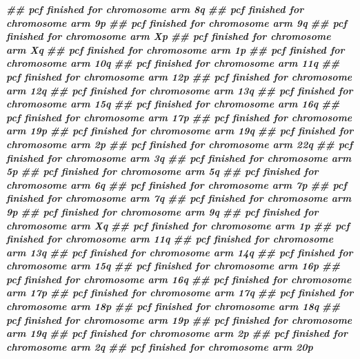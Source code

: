 \documentclass[
  12pt,
  a4paper,
  twoside]{book}
\newenvironment{Shaded}{\begin{snugshade}}{\end{snugshade}}
\newcommand{\DocumentationTok}[1]{\textcolor[rgb]{0.56,0.35,0.01}{\textbf{\textit{#1}}}}
\begin{document}
\begin{Shaded}
\begin{Highlighting}[]
\DocumentationTok{\#\# pcf finished for chromosome arm 8q }
\DocumentationTok{\#\# pcf finished for chromosome arm 9p }
\DocumentationTok{\#\# pcf finished for chromosome arm 9q }
\DocumentationTok{\#\# pcf finished for chromosome arm Xp }
\DocumentationTok{\#\# pcf finished for chromosome arm Xq }
\DocumentationTok{\#\# pcf finished for chromosome arm 1p }
\DocumentationTok{\#\# pcf finished for chromosome arm 10q }
\DocumentationTok{\#\# pcf finished for chromosome arm 11q }
\DocumentationTok{\#\# pcf finished for chromosome arm 12p }
\DocumentationTok{\#\# pcf finished for chromosome arm 12q }
\DocumentationTok{\#\# pcf finished for chromosome arm 13q }
\DocumentationTok{\#\# pcf finished for chromosome arm 15q }
\DocumentationTok{\#\# pcf finished for chromosome arm 16q }
\DocumentationTok{\#\# pcf finished for chromosome arm 17p }
\DocumentationTok{\#\# pcf finished for chromosome arm 19p }
\DocumentationTok{\#\# pcf finished for chromosome arm 19q }
\DocumentationTok{\#\# pcf finished for chromosome arm 2p }
\DocumentationTok{\#\# pcf finished for chromosome arm 22q }
\DocumentationTok{\#\# pcf finished for chromosome arm 3q }
\DocumentationTok{\#\# pcf finished for chromosome arm 5p }
\DocumentationTok{\#\# pcf finished for chromosome arm 5q }
\DocumentationTok{\#\# pcf finished for chromosome arm 6q }
\DocumentationTok{\#\# pcf finished for chromosome arm 7p }
\DocumentationTok{\#\# pcf finished for chromosome arm 7q }
\DocumentationTok{\#\# pcf finished for chromosome arm 9p }
\DocumentationTok{\#\# pcf finished for chromosome arm 9q }
\DocumentationTok{\#\# pcf finished for chromosome arm Xq }
\DocumentationTok{\#\# pcf finished for chromosome arm 1p }
\DocumentationTok{\#\# pcf finished for chromosome arm 11q }
\DocumentationTok{\#\# pcf finished for chromosome arm 13q }
\DocumentationTok{\#\# pcf finished for chromosome arm 14q }
\DocumentationTok{\#\# pcf finished for chromosome arm 15q }
\DocumentationTok{\#\# pcf finished for chromosome arm 16p }
\DocumentationTok{\#\# pcf finished for chromosome arm 16q }
\DocumentationTok{\#\# pcf finished for chromosome arm 17p }
\DocumentationTok{\#\# pcf finished for chromosome arm 17q }
\DocumentationTok{\#\# pcf finished for chromosome arm 18p }
\DocumentationTok{\#\# pcf finished for chromosome arm 18q }
\DocumentationTok{\#\# pcf finished for chromosome arm 19p }
\DocumentationTok{\#\# pcf finished for chromosome arm 19q }
\DocumentationTok{\#\# pcf finished for chromosome arm 2p }
\DocumentationTok{\#\# pcf finished for chromosome arm 2q }
\DocumentationTok{\#\# pcf finished for chromosome arm 20p }

\end{Highlighting}
\end{Shaded}
\end{document}

